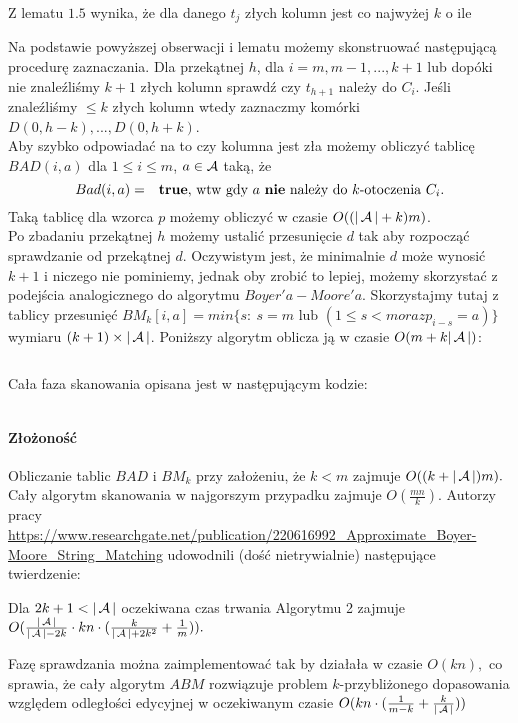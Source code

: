 \begin{remark-thm}
    Z lematu $1.5$ wynika, że dla danego $t_j$ złych kolumn jest co najwyżej $k$ o ile 
\end{remark-thm}

Na podstawie powyższej obserwacji i lematu możemy skonstruować następującą procedurę zaznaczania. Dla przekątnej $h$, dla $i=m, m-1, ..., k+1$ lub dopóki nie znaleźliśmy $k+1$ złych kolumn sprawdź czy $t_{h+1}$ należy do $C_i$. 
Jeśli znaleźliśmy $\leq k$ złych kolumn wtedy zaznaczmy komórki $D(0, h-k),...,D(0,h+k)$.\\
Aby szybko odpowiadać na to czy kolumna jest zła możemy obliczyć tablicę $BAD(i,a)$ dla $1 \leq i \leq m$, $a \in \operatorname{\mathcal{A}}$ taką, że
\[
    Bad(i,a) = \text{ \textbf{ true}, wtw  gdy $a$ \textbf{nie} należy do $k$-otoczenia $C_i$.}
\]
Taką tablicę dla wzorca $p$ możemy obliczyć w czasie $O((|\operatorname{\mathcal{A}}|+k)m)$.\\
Po zbadaniu przekątnej $h$ możemy ustalić przesunięcie $d$ tak aby rozpocząć sprawdzanie od przekątnej $d$. Oczywistym jest, że minimalnie $d$ może wynosić $k+1$ i niczego nie pominiemy, jednak oby zrobić to lepiej, możemy skorzystać z podejścia analogicznego do algorytmu $Boyer'a-Moore'a$. Skorzystajmy tutaj z tablicy przesunięć $BM_k[i,a] = min \{s:\ s=m \text{ lub } (1\leq s < m oraz p_{i-s} = a)\}$ wymiaru $(k+1) \times |\operatorname{\mathcal{A}}|$. Poniższy algorytm oblicza ją w czasie $O(m+k|\operatorname{\mathcal{A}}|)$:

\begin{code}
\inputminted{python}{text/code/approximate-string-matching/bm_multidim.py}
\end{code}

Cała faza skanowania opisana jest w następującym kodzie:

\begin{code}
\inputminted{python}{text/code/approximate-string-matching/scan_faze.py}
\end{code}

\paragraph{Złożoność}

Obliczanie tablic $BAD$ i $BM_k$ przy założeniu, że $k < m$ zajmuje $O((k+|\operatorname{\mathcal{A}}|)m).$ Cały algorytm skanowania w najgorszym przypadku zajmuje $O(\frac{mn}{k}).$ Autorzy pracy \url{https://www.researchgate.net/publication/220616992_Approximate_Boyer-Moore_String_Matching} udowodnili (dość nietrywialnie) następujące twierdzenie:

\begin{theorem}{}{}
    Dla $2k+1 < |\operatorname{\mathcal{A}}|$ oczekiwana czas trwania Algorytmu 2 zajmuje $O(\frac{|\operatorname{\mathcal{A}}|}{|\operatorname{\mathcal{A}}| - 2k} \cdot kn \cdot (\frac{k}{|\operatorname{\mathcal{A}}| + 2k^2} + \frac{1}{m})).$
\end{theorem}

Fazę sprawdzania można zaimplementować tak by działała w czasie $O(kn),$ co sprawia, że cały algorytm $ABM$ rozwiązuje problem $k$-przybliżonego dopasowania względem odległości edycyjnej w oczekiwanym czasie $O(kn\cdot(\frac{1}{m-k} + \frac{k}{|\operatorname{\mathcal{A}}|}))$
